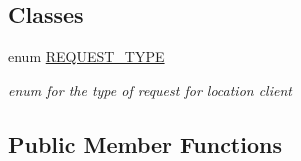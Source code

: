 \subsection*{Classes}
\begin{DoxyCompactItemize}
\item 
enum \hyperlink{enumuk_1_1ac_1_1swan_1_1digitaltrails_1_1activities_1_1_map_activity_1_1_r_e_q_u_e_s_t___t_y_p_e}{R\+E\+Q\+U\+E\+S\+T\+\_\+\+T\+Y\+P\+E}
\begin{DoxyCompactList}\small\item\em enum for the type of request for location client \end{DoxyCompactList}\end{DoxyCompactItemize}
\subsection*{Public Member Functions}
